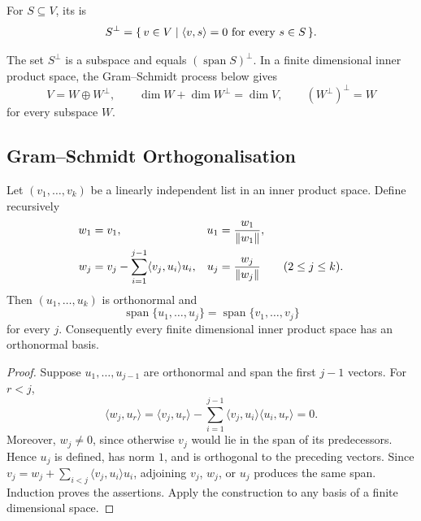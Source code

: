 \begin{Definition}
For $S\subseteq V$, its  is
\begin{equation*}
S^\perp=\qty{\, v\in V \mid \langle v,s\rangle=0\text{ for every }s\in S \,}.
\end{equation*}
\end{Definition}

The set $S^\perp$ is a subspace and equals $(\operatorname{span}S)^\perp$. In a finite dimensional inner product space, the Gram--Schmidt process below gives
\begin{equation*}
V=W\oplus W^\perp,
\qquad
\dim W+\dim W^\perp=\dim V,
\qquad
(W^\perp)^\perp=W
\end{equation*}
for every subspace $W$.

\subsection{Gram--Schmidt Orthogonalisation}

\begin{Theorem}\label{thm:GramSchmidt}
Let $(v_1,\ldots,v_k)$ be a linearly independent list in an inner product space. Define recursively
\begin{align*}
w_1&=v_1,& u_1&=\frac{w_1}{\norm{w_1}},\\
w_j&=v_j-\sum_{i=1}^{j-1}\langle v_j,u_i\rangle u_i,& u_j&=\frac{w_j}{\norm{w_j}}\qquad(2\le j\le k).
\end{align*}
Then $(u_1,\ldots,u_k)$ is orthonormal and
\begin{equation*}
\operatorname{span}\{u_1,\ldots,u_j\}=\operatorname{span}\{v_1,\ldots,v_j\}
\end{equation*}
for every $j$. Consequently every finite dimensional inner product space has an orthonormal basis.
\end{Theorem}
\begin{proof}
Suppose $u_1,\ldots,u_{j-1}$ are orthonormal and span the first $j-1$ vectors. For $r<j$,
\begin{equation*}
\langle w_j,u_r\rangle=\langle v_j,u_r\rangle-\sum_{i=1}^{j-1}\langle v_j,u_i\rangle\langle u_i,u_r\rangle=0.
\end{equation*}
Moreover, $w_j\ne0$, since otherwise $v_j$ would lie in the span of its predecessors. Hence $u_j$ is defined, has norm $1$, and is orthogonal to the preceding vectors. Since $v_j=w_j+\sum_{i<j}\langle v_j,u_i\rangle u_i$, adjoining $v_j$, $w_j$, or $u_j$ produces the same span. Induction proves the assertions. Apply the construction to any basis of a finite dimensional space.
\end{proof}

